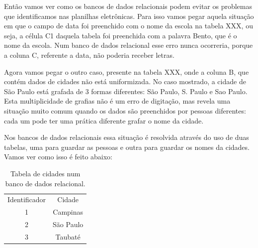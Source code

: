 \documentclass[
12pt,		%
openright,	%
twoside,  %
a4paper,			%
chapter=TITLE,		%
english,			%
french,				%
spanish,			%
brazil				%
]{USPSC-classe/USPSC}
\begin{document}
Ent\~ao vamos ver como os bancos de dados relacionais podem evitar os problemas que identificamos nas planilhas eletr\^onicas. Para isso vamos pegar aquela situa\c{c}\~ao em que o campo de data foi preenchido com o nome da escola na tabela XXX, ou seja, a c\'elula C1 daquela tabela foi preenchida com a palavra \textquotedbl Bento\textquotedbl , que \'e o nome da escola. Num banco de dados relacional esse erro nunca ocorreria, porque a coluna C, referente a data, n\~ao poderia receber letras.














Agora vamos pegar o outro caso, presente na tabela XXX, onde a coluna B, que cont\'em dados de cidades n\~ao est\'a uniformizada. No caso mostrado, a cidade de S\~ao Paulo est\'a grafada de 3 formas diferentes: S\~ao Paulo, S. Paulo e Sao Paulo. Esta multiplicidade de grafias n\~ao \'e um erro de digita\c{c}\~ao, mas revela uma situa\c{c}\~ao muito comum quando os dados s\~ao preenchidos por pessoas diferentes: cada um pode ter uma pr\'atica diferente grafar o nome da cidade.














Nos bancos de dados relacionais essa situa\c{c}\~ao \'e resolvida atrav\'es do uso de duas tabelas, uma para guardar as pessoas e outra para guardar os nomes da cidades. Vamos ver como isso \'e feito abaixo:


















\begin{table}[htb]
\tiny
\caption{\label{e4d91173469576e32f3571663aaeb94e34415b3e}Tabela de cidades num banco de dados relacional.}

\centering
\begin{tabular}{|c|c|}
\hline
Identificador  &  Cidade \\
1  &  Campinas \\
2  &  S\~ao Paulo \\
3  &  Taubat\'e \\
\hline
\end{tabular}
\end{table}
\end{document}
